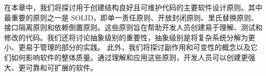 在本章中，我们将探讨用于创建结构良好且可维护代码的主要软件设计原则。其中最重要的原则之一是 SOLID，即单一责任原则、开放封闭原则、里氏替换原则、接口隔离原则和依赖倒置原则。这些原则旨在帮助开发人员创建易于理解、测试和修改的代码。我们还将讨论抽象级别的重要性，抽象级别是将复杂系统分解为更小、更易于管理的部分的实践。
此外，我们将探讨副作用和可变性的概念以及它们如何影响软件的整体质量。通过理解和应用这些原则，开发人员可以创建更强大、更可靠和可扩展的软件。